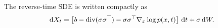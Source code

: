 
\begin{remark}
  The reverse-time SDE is written compactly as
  \begin{equation}
    \,\mathrm{d} X_t = \left[b-\mathrm{div}(\sigma\sigma^\top) - \sigma\sigma^\top\nabla_x\log p(x,t) \right]\,\mathrm{d} t + \sigma \,\mathrm{d} W.
  \end{equation}
\end{remark}